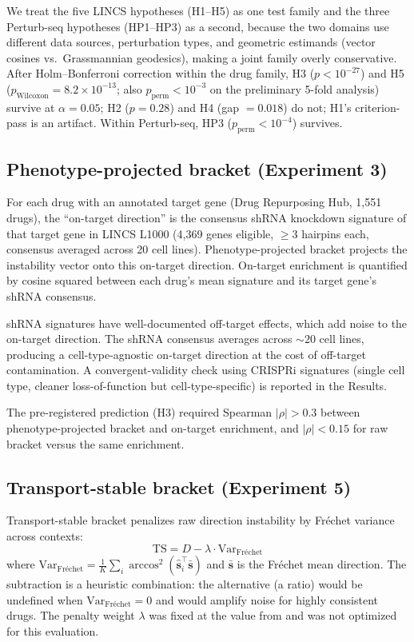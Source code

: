 \documentclass[11pt]{article}
\begin{document}
We treat the five LINCS hypotheses (H1--H5) as one test family and the
three Perturb-seq hypotheses (HP1--HP3) as a second, because the two
domains use different data sources, perturbation types, and geometric
estimands (vector cosines vs.\ Grassmannian geodesics), making a joint
family overly conservative. After Holm--Bonferroni
correction within the drug family, H3 ($p < 10^{-27}$) and H5
($p_{\text{Wilcoxon}} = 8.2 \times 10^{-13}$; also
$p_{\text{perm}} < 10^{-3}$ on the preliminary 5-fold analysis) survive
at $\alpha = 0.05$; H2 ($p = 0.28$) and H4 (gap $= 0.018$) do not;
H1's criterion-pass is an artifact.
Within Perturb-seq, HP3 ($p_{\text{perm}} < 10^{-4}$) survives.

\subsection{Phenotype-projected bracket (Experiment 3)}

For each drug with an annotated target gene (Drug Repurposing Hub,
1{,}551 drugs), the ``on-target direction'' is the consensus shRNA
knockdown signature of that target gene in LINCS L1000 (4{,}369 genes
eligible, $\geq$3 hairpins each, consensus averaged across 20 cell lines).
Phenotype-projected bracket projects the instability vector onto this
on-target direction. On-target enrichment is quantified by cosine squared
between each drug's mean signature and its target gene's shRNA consensus.

shRNA signatures have well-documented off-target effects, which add noise
to the on-target direction. The shRNA consensus averages across
${\sim}20$ cell lines, producing a cell-type-agnostic on-target
direction at the cost of off-target contamination. A convergent-validity
check using CRISPRi signatures (single cell type, cleaner
loss-of-function but cell-type-specific) is reported in the Results.

The pre-registered prediction (H3) required Spearman $|\rho| > 0.3$ between
phenotype-projected bracket and on-target enrichment, and $|\rho| < 0.15$
for raw bracket versus the same enrichment.

\subsection{Transport-stable bracket (Experiment 5)}

Transport-stable bracket penalizes raw direction instability by Fr\'{e}chet
variance across contexts:
\begin{equation}
  \text{TS} = D - \lambda \cdot \text{Var}_{\text{Fr\'echet}}
  \label{eq:ts}
\end{equation}
where $\text{Var}_{\text{Fr\'echet}} = \frac{1}{K}\sum_i
\arccos^2(\hat{\mathbf{s}}_i^\top \bar{\mathbf{s}})$ and
$\bar{\mathbf{s}}$ is the Fr\'echet mean direction. The subtraction is a
heuristic combination: the alternative (a ratio) would be undefined when
$\text{Var}_{\text{Fr\'echet}} = 0$ and would amplify noise for highly
consistent drugs. The penalty weight $\lambda$ was fixed at the value from
\citet{tower2026drug} and was not optimized for this evaluation.
\end{document}
